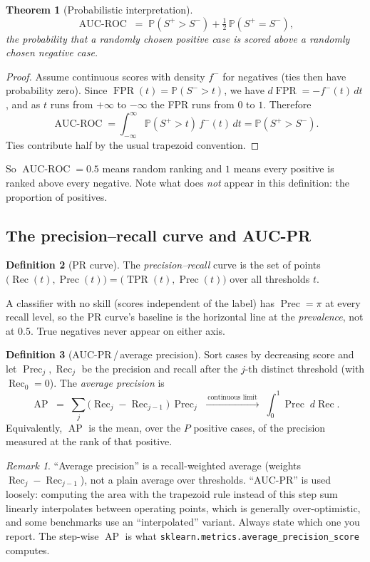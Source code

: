 \documentclass[11pt,a4paper]{article}
\newcommand{\Prob}{\mathbb{P}}
\DeclareMathOperator{\TPR}{TPR}
\DeclareMathOperator{\FPR}{FPR}
\DeclareMathOperator{\Prec}{Prec}
\DeclareMathOperator{\Rec}{Rec}
\DeclareMathOperator{\AUROC}{AUC\text{-}ROC}
\DeclareMathOperator{\AP}{AP}
\theoremstyle{plain}
\newtheorem{theorem}{Theorem}
\theoremstyle{definition}
\newtheorem{definition}[theorem]{Definition}
\theoremstyle{remark}
\newtheorem*{remark}{Remark}
\begin{document}
\begin{theorem}[Probabilistic interpretation]\label{thm:auc}
\[
  \AUROC \;=\; \Prob(S^{+}>S^{-}) + \tfrac12\,\Prob(S^{+}=S^{-}),
\]
the probability that a randomly chosen positive case is scored above a randomly chosen negative case.
\end{theorem}
\begin{proof}
Assume continuous scores with density $f^{-}$ for negatives (ties then have probability zero). Since
$\FPR(t)=\Prob(S^{-}>t)$, we have $d\FPR=-f^{-}(t)\,dt$, and as $t$ runs from $+\infty$ to $-\infty$ the
FPR runs from $0$ to $1$. Therefore
\[
  \AUROC=\int_{-\infty}^{\infty}\Prob(S^{+}>t)\,f^{-}(t)\,dt=\Prob(S^{+}>S^{-}).
\]
Ties contribute half by the usual trapezoid convention.
\end{proof}

So $\AUROC=0.5$ means random ranking and $1$ means every positive is ranked above every negative.
Note what does \emph{not} appear in this definition: the proportion of positives.

\subsection{The precision--recall curve and AUC-PR}

\begin{definition}[PR curve]
The \emph{precision--recall} curve is the set of points $\big(\Rec(t),\Prec(t)\big)=\big(\TPR(t),\Prec(t)\big)$
over all thresholds $t$.
\end{definition}

A classifier with no skill (scores independent of the label) has $\Prec=\pi$ at every recall level, so
the PR curve's baseline is the horizontal line at the \emph{prevalence}, not at $0.5$. True negatives
never appear on either axis.

\begin{definition}[AUC-PR\,/\,average precision]
Sort cases by decreasing score and let $\Prec_j,\Rec_j$ be the precision and recall after the $j$-th
distinct threshold (with $\Rec_0=0$). The \emph{average precision} is
\[
  \AP \;=\; \sum_{j}\big(\Rec_j-\Rec_{j-1}\big)\,\Prec_j
  \;\xrightarrow{\;\text{continuous limit}\;}\;
  \int_0^1 \Prec\; d\Rec .
\]
Equivalently, $\AP$ is the mean, over the $P$ positive cases, of the precision measured at the rank of
that positive.
\end{definition}

\begin{remark}
``Average precision'' is a recall-weighted average (weights $\Rec_j-\Rec_{j-1}$), not a plain average over
thresholds. ``AUC-PR'' is used loosely: computing the area with the trapezoid rule instead of this
step sum linearly interpolates between operating points, which is generally over-optimistic, and some
benchmarks use an ``interpolated'' variant. Always state which one you report. The step-wise
$\AP$ is what \texttt{sklearn.metrics.average\_precision\_score} computes.
\end{remark}
\end{document}
